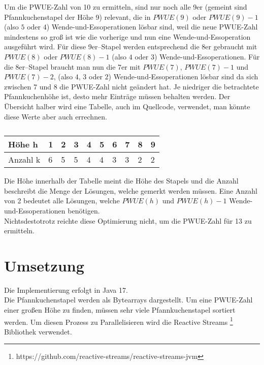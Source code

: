 Um die PWUE-Zahl von 10 zu ermitteln, sind nur noch alle 9er (gemeint sind Pfannkuchenstapel der Höhe 9) relevant,
die in $PWUE(9)$ oder $PWUE(9) - 1$ (also $5$ oder $4$) Wende-und-Essoperationen lösbar sind, weil die neue PWUE-Zahl
mindestens so gro{\ss} ist wie die vorherige und nun eine Wende-und-Essoperation ausgeführt wird.
Für diese 9er--Stapel werden entsprechend die 8er gebraucht mit $PWUE(8)$ oder $PWUE(8) - 1$
(also $4$ oder $3$) Wende-und-Essoperationen.
Für die 8er--Stapel braucht man nun die 7er mit $PWUE(7)$, $PWUE(7) - 1$ und $PWUE(7) - 2$,
(also $4$, $3$ oder $2$) Wende-und-Essoperationen lösbar sind da sich zwischen 7 und 8 die PWUE-Zahl nicht geändert hat.
Je niedriger die betrachtete Pfannkuchenhöhe ist, desto mehr Einträge müssen behalten werden.
Der Übersicht halber wird eine Tabelle, auch im Quellcode, verwendet, man könnte diese Werte aber auch errechnen. \\
\begin{table}[h]
    \centering
    \begin{tabular}{|l|l|l|l|l|l|l|l|l|l|}
        \hline
        Höhe h   & 1 & 2 & 3 & 4 & 5 & 6 & 7 & 8 & 9 \\ \hline
        Anzahl k & 6 & 5 & 5 & 4 & 4 & 3 & 3 & 2 & 2 \\ \hline
    \end{tabular}
    \caption{}
    \label{tab:k-fuer-10}
\end{table}
Die Höhe innerhalb der Tabelle meint die Höhe des Stapels und die Anzahl beschreibt die Menge der Lösungen, welche gemerkt werden müssen.
Eine Anzahl von 2 bedeutet alle Lösungen, welche $PWUE(h)$ und $PWUE(h) - 1$ Wende-und-Essoperationen benötigen. \\
Nichtsdestotrotz reichte diese Optimierung nicht, um die PWUE-Zahl für 13 zu ermitteln.


\section{Umsetzung}\label{sec:umsetzung}
Die Implementierung erfolgt in Java 17. \\
Die Pfannkuchenstapel werden als Bytearrays dargestellt.
Um eine PWUE-Zahl einer großen Höhe zu finden, müssen sehr viele Pfannkuchenstapel sortiert werden.
Um diesen Prozess zu Parallelisieren wird die Reactive Streams \footnote{https://github.com/reactive-streams/reactive-streams-jvm}
Bibliothek verwendet.

